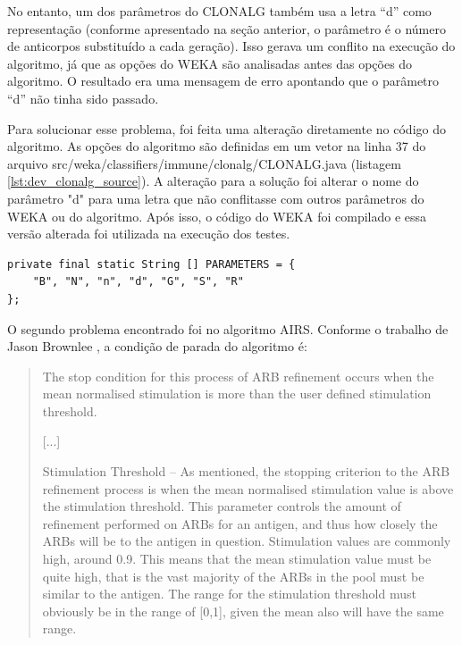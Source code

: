 No entanto, um dos parâmetros do CLONALG também usa a letra ``d'' como representação (conforme apresentado na seção anterior, o parâmetro é o número de anticorpos substituído a cada geração). Isso gerava um conflito na execução do algoritmo, já que as opções do WEKA são analisadas antes das opções do algoritmo. O resultado era uma mensagem de erro apontando que o parâmetro ``d'' não tinha sido passado.

Para solucionar esse problema, foi feita uma alteração diretamente no código do algoritmo. As opções do algoritmo são definidas em um vetor na linha 37 do arquivo src/weka/classifiers/immune/clonalg/CLONALG.java (listagem \ref{lst:dev_clonalg_source}). A alteração para a solução foi alterar o nome do parâmetro "d" para uma letra que não conflitasse com outros parâmetros do WEKA ou do algoritmo. Após isso, o código do WEKA foi compilado e essa versão alterada foi utilizada na execução dos testes.

\vspace{0.5cm}
\begin{lstlisting}[caption=Código fonte original do CLONALG, label=lst:dev_clonalg_source]
private final static String [] PARAMETERS = {
    "B", "N", "n", "d", "G", "S", "R"
};
\end{lstlisting}
\vspace{0.5cm}

O segundo problema encontrado foi no algoritmo AIRS. Conforme o trabalho de Jason Brownlee \cite{Brownlee2005}, a condição de parada do algoritmo é:

\begin{quote}
The stop condition for this process of ARB refinement occurs when the
mean normalised stimulation is more than the user defined stimulation
threshold.

[...]

Stimulation Threshold – As mentioned, the stopping criterion to the ARB
refinement process is when the mean normalised stimulation value is above
the stimulation threshold. This parameter controls the amount of refinement
performed on ARBs for an antigen, and thus how closely the ARBs will be
to the antigen in question. Stimulation values are commonly high, around
0.9. This means that the mean stimulation value must be quite high, that is
the vast majority of the ARBs in the pool must be similar to the antigen.
The range for the stimulation threshold must obviously be in the range of
[0,1], given the mean also will have the same range.
\end{quote}

